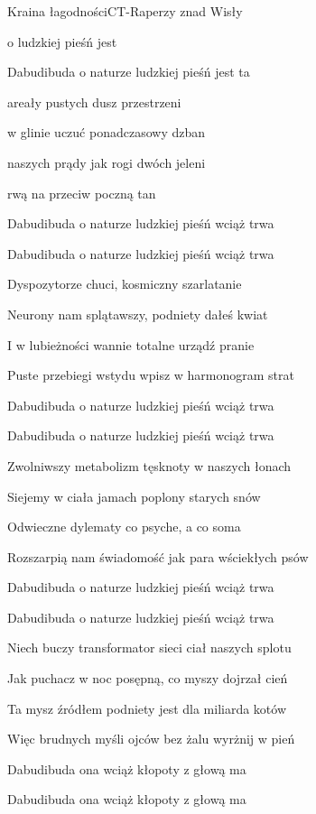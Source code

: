 \begin{song}{Kraina łagodności}{C}{}{T-Raperzy znad Wisły}{}{}
  \begin{SBChorus}
     o  ludzkiej pieśń jest 

    Dabudibuda o naturze ludzkiej pieśń jest ta
  \end{SBChorus}
  \begin{SBVerse}
     areały pustych dusz przestrzeni

     w glinie uczuć ponadczasowy dzban

     naszych prądy jak rogi dwóch jeleni

     rwą na przeciw  poczną tan
  \end{SBVerse}
  \begin{SBChorus}
    Dabudibuda o naturze ludzkiej pieśń wciąż trwa

    Dabudibuda o naturze ludzkiej pieśń wciąż trwa
  \end{SBChorus}
  \begin{SBVerse}
    Dyspozytorze chuci, kosmiczny szarlatanie

    Neurony nam splątawszy, podniety dałeś kwiat

    I w lubieżności wannie totalne urządź pranie

    Puste przebiegi wstydu wpisz w harmonogram strat
  \end{SBVerse}
  \begin{SBChorus}
    Dabudibuda o naturze ludzkiej pieśń wciąż trwa

    Dabudibuda o naturze ludzkiej pieśń wciąż trwa
  \end{SBChorus}
  \begin{SBVerse}
    Zwolniwszy metabolizm tęsknoty w naszych łonach

    Siejemy w ciała jamach poplony starych snów

    Odwieczne dylematy co psyche, a co soma

    Rozszarpią nam świadomość jak para wściekłych psów
  \end{SBVerse}
  \begin{SBChorus}
    Dabudibuda o naturze ludzkiej pieśń wciąż trwa

    Dabudibuda o naturze ludzkiej pieśń wciąż trwa
  \end{SBChorus}
  \begin{SBVerse}
    Niech buczy transformator sieci ciał naszych splotu

    Jak puchacz w noc posępną, co myszy dojrzał cień

    Ta mysz źródłem podniety jest dla miliarda kotów

    Więc brudnych myśli ojców bez żalu wyrżnij w pień
  \end{SBVerse}
  \begin{SBChorus}
    Dabudibuda ona wciąż kłopoty z głową ma

    Dabudibuda ona wciąż kłopoty z głową ma
  \end{SBChorus}
\end{song}
